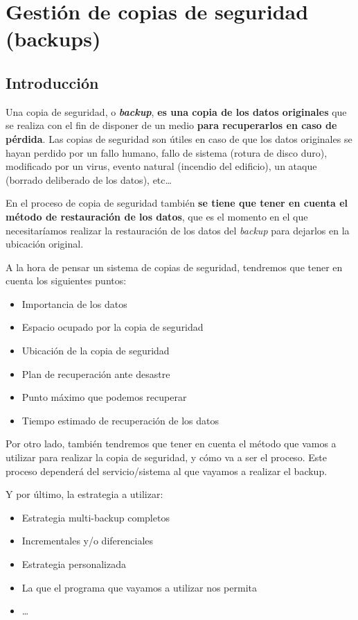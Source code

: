 \hypertarget{gestion_copias_de_seguridad}{}
\chapter{Gestión de copias de seguridad (backups)}

\section{Introducción}

Una copia de seguridad, o \textbf{\textit{backup}}, \textbf{es una copia de los datos originales} que se realiza con el fin de disponer de un medio \textbf{para recuperarlos en caso de pérdida}. Las copias de seguridad son útiles en caso de que los datos originales se hayan perdido por un fallo humano, fallo de sistema (rotura de disco duro), modificado por un virus,  evento natural (incendio del edificio), un ataque (borrado deliberado de los datos), etc…

En el proceso de copia de seguridad también \textbf{se tiene que tener en cuenta el método de restauración de los datos}, que es el momento en el que necesitaríamos realizar la restauración de los datos del \textit{backup} para dejarlos en la ubicación original.

A la hora de pensar un sistema de copias de seguridad, tendremos que tener en cuenta los siguientes puntos:

\begin{itemize}
    \item Importancia de los datos
    \item Espacio ocupado por la copia de seguridad
    \item Ubicación de la copia de seguridad
    \item Plan de recuperación ante desastre
    \item Punto máximo que podemos recuperar
    \item Tiempo estimado de recuperación de los datos
\end{itemize}

Por otro lado, también tendremos que tener en cuenta el método que vamos a utilizar para realizar la copia de seguridad, y cómo va a ser el proceso. Este proceso dependerá del servicio/sistema al que vayamos a realizar el backup.

Y por último, la estrategia a utilizar:

\begin{itemize}
    \item Estrategia multi-backup completos
    \item Incrementales y/o diferenciales
    \item Estrategia personalizada
    \item La que el programa que vayamos a utilizar nos permita
    \item …
\end{itemize}

